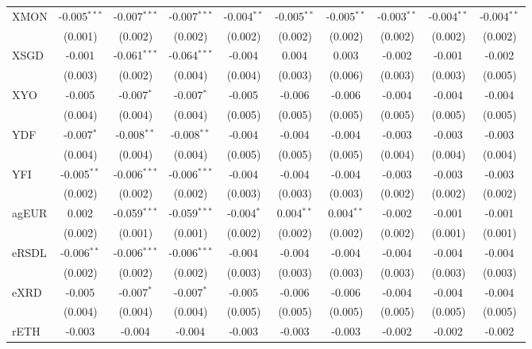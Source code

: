 \begin{table}[!htbp]
\begin{tabular}{@{\extracolsep{5pt}}lccccccccc}
 XMON & -0.005$^{***}$ & -0.007$^{***}$ & -0.007$^{***}$ & -0.004$^{**}$ & -0.005$^{**}$ & -0.005$^{**}$ & -0.003$^{**}$ & -0.004$^{**}$ & -0.004$^{**}$ \\
  & (0.001) & (0.002) & (0.002) & (0.002) & (0.002) & (0.002) & (0.002) & (0.002) & (0.002) \\
 XSGD & -0.001$^{}$ & -0.061$^{***}$ & -0.064$^{***}$ & -0.004$^{}$ & 0.004$^{}$ & 0.003$^{}$ & -0.002$^{}$ & -0.001$^{}$ & -0.002$^{}$ \\
  & (0.003) & (0.002) & (0.004) & (0.004) & (0.003) & (0.006) & (0.003) & (0.003) & (0.005) \\
 XYO & -0.005$^{}$ & -0.007$^{*}$ & -0.007$^{*}$ & -0.005$^{}$ & -0.006$^{}$ & -0.006$^{}$ & -0.004$^{}$ & -0.004$^{}$ & -0.004$^{}$ \\
  & (0.004) & (0.004) & (0.004) & (0.005) & (0.005) & (0.005) & (0.005) & (0.005) & (0.005) \\
 YDF & -0.007$^{*}$ & -0.008$^{**}$ & -0.008$^{**}$ & -0.004$^{}$ & -0.004$^{}$ & -0.004$^{}$ & -0.003$^{}$ & -0.003$^{}$ & -0.003$^{}$ \\
  & (0.004) & (0.004) & (0.004) & (0.005) & (0.005) & (0.005) & (0.004) & (0.004) & (0.004) \\
 YFI & -0.005$^{**}$ & -0.006$^{***}$ & -0.006$^{***}$ & -0.004$^{}$ & -0.004$^{}$ & -0.004$^{}$ & -0.003$^{}$ & -0.003$^{}$ & -0.003$^{}$ \\
  & (0.002) & (0.002) & (0.002) & (0.003) & (0.003) & (0.003) & (0.002) & (0.002) & (0.002) \\
 agEUR & 0.002$^{}$ & -0.059$^{***}$ & -0.059$^{***}$ & -0.004$^{*}$ & 0.004$^{**}$ & 0.004$^{**}$ & -0.002$^{}$ & -0.001$^{}$ & -0.001$^{}$ \\
  & (0.002) & (0.001) & (0.001) & (0.002) & (0.002) & (0.002) & (0.002) & (0.001) & (0.001) \\
 eRSDL & -0.006$^{**}$ & -0.006$^{***}$ & -0.006$^{***}$ & -0.004$^{}$ & -0.004$^{}$ & -0.004$^{}$ & -0.004$^{}$ & -0.004$^{}$ & -0.004$^{}$ \\
  & (0.002) & (0.002) & (0.002) & (0.003) & (0.003) & (0.003) & (0.003) & (0.003) & (0.003) \\
 eXRD & -0.005$^{}$ & -0.007$^{*}$ & -0.007$^{*}$ & -0.005$^{}$ & -0.006$^{}$ & -0.006$^{}$ & -0.004$^{}$ & -0.004$^{}$ & -0.004$^{}$ \\
  & (0.004) & (0.004) & (0.004) & (0.005) & (0.005) & (0.005) & (0.005) & (0.005) & (0.005) \\
 rETH & -0.003$^{}$ & -0.004$^{}$ & -0.004$^{}$ & -0.003$^{}$ & -0.003$^{}$ & -0.003$^{}$ & -0.002$^{}$ & -0.002$^{}$ & -0.002$^{}$ \\

\end{tabular}
\end{table}
